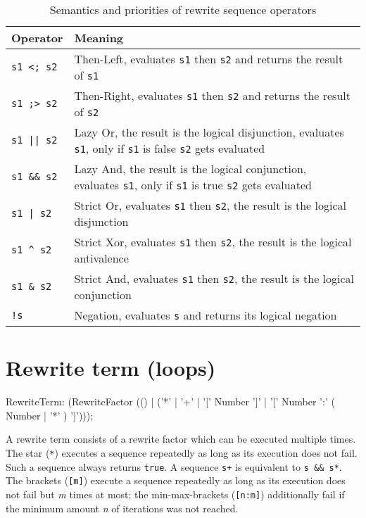 \begin{table}[htbp]
    \begin{tabularx}{\linewidth}{l|X}
        \bf Operator & \bf Meaning \\\hline\hline
        \verb/s1 <; s2/ & Then-Left, evaluates \texttt{s1} then \texttt{s2} and returns the result of \texttt{s1}\\
		\verb/s1 ;> s2/ & Then-Right, evaluates \texttt{s1} then \texttt{s2} and returns the result of \texttt{s2}\\\hline
        \verb/s1 || s2/ & Lazy Or, the result is the logical disjunction, evaluates \texttt{s1}, only if \texttt{s1} is false \texttt{s2} gets evaluated\\\hline
        \verb/s1 && s2/ & Lazy And, the result is the logical conjunction, evaluates \texttt{s1}, only if \texttt{s1} is true \texttt{s2} gets evaluated\\\hline
        \verb/s1 | s2/ & Strict Or, evaluates \texttt{s1} then \texttt{s2}, the result is the logical disjunction\\\hline
        \verb/s1 ^ s2/ & Strict Xor, evaluates \texttt{s1} then \texttt{s2}, the result is the logical antivalence\\\hline
        \verb/s1 & s2/ & Strict And, evaluates \texttt{s1} then \texttt{s2}, the result is the logical conjunction\\\hline
        \verb/!s/ & Negation, evaluates \texttt{s} and returns its logical negation\\\hline
	\end{tabularx}    
    \caption{Semantics and priorities of rewrite sequence operators}
    \label{tbl:sequ:op}
\end{table}


\section{Rewrite term (loops)}

\begin{rail}
  RewriteTerm: 
    (RewriteFactor (() | ('*' | '+' | '[' Number ']' | '[' Number ':' ( Number | '*' ) ']')));
\end{rail}

A rewrite term consists of a rewrite factor which can be executed multiple times.
The star (\texttt{*}) executes a sequence repeatedly as long as its execution does not fail. 
Such a sequence always returns \texttt{true}.
A sequence \verb#s+# is equivalent to \verb#s && s*#.
The brackets (\texttt{[m]}) execute a sequence repeatedly as long as its execution does not fail but \emph{m} times at most;
the min-max-brackets (\texttt{[n:m]}) additionally fail if the minimum amount \emph{n} of iterations was not reached.


